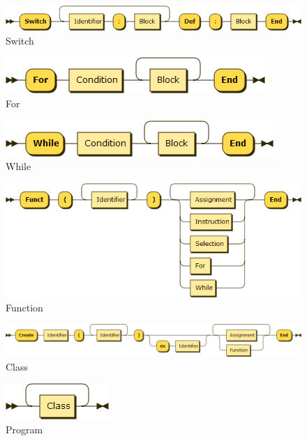 \begin{figure}[h!]
\centering
\includegraphics[scale=0.4]{kepek/rr_switch.png}
\caption{Switch}
\label{fig:rr_switch}
\end{figure}

\begin{figure}[h!]
\centering
\includegraphics[scale=0.4]{kepek/rr_for.png}
\caption{For}
\label{fig:rr_for}
\end{figure}

\begin{figure}[h!]
\centering
\includegraphics[scale=0.4]{kepek/rr_while.png}
\caption{While}
\label{fig:rr_while}
\end{figure}

\begin{figure}[h!]
\centering
\includegraphics[scale=0.4]{kepek/rr_function.png}
\caption{Function}
\label{fig:rr_function}
\end{figure}

\begin{figure}[h!]
\centering
\includegraphics[scale=0.4]{kepek/rr_class.png}
\caption{Class}
\label{fig:rr_class}
\end{figure}

\begin{figure}[h!]
\centering
\includegraphics[scale=1]{kepek/rr_program.png}
\caption{Program}
\label{fig:rr_program}
\end{figure}

